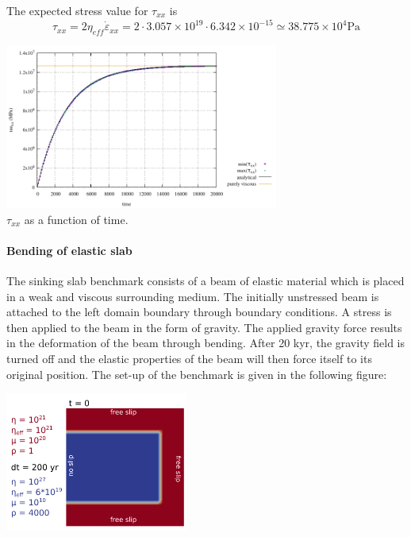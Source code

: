 The expected stress value for $\tau_{xx}$ is 
\[
\tau_{xx} = 2 \eta_{eff} \dot{\varepsilon}_{xx} 
= 2 \cdot 3.057\times 10^{19} \cdot 6.342\times 10^{-15} 
\simeq 38.775 \times 10^4 \text{Pa}
\]

\begin{center}
\includegraphics[width=9cm]{python_codes/fieldstone_64/results/buildup/tauxx}\\
{\captionfont $\tau_{xx}$ as a function of time.}
\end{center}



\paragraph{Bending of elastic slab}

The sinking slab benchmark consists of a beam of elastic material which is placed 
in a weak and viscous surrounding medium. The initially unstressed beam is attached 
to the left domain boundary through boundary conditions. A stress is then applied to 
the beam in the form of gravity. The applied gravity force results in the deformation 
of the beam through bending. After 20 kyr, the gravity field is turned off and the 
elastic properties of the beam will then force itself to its original position.  
The set-up of the benchmark is given in the following figure: 

\begin{center}
\includegraphics[width=6cm]{python_codes/fieldstone_64/images/poster_benchmark.png}\\
\end{center}

